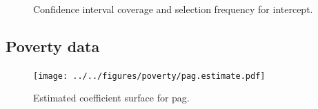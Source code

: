\documentclass[authoryear ,review]{elsarticle}
\begin{document}
			
			\begin{figure}
				\begin{center}
					\caption{Confidence interval coverage and selection frequency for intercept.\label{figIntercept}}
				\end{center}
			\end{figure}
			
			
			
			
			
		\subsection{Poverty data}
			\begin{figure}
				\begin{center}
					\texttt{[image: ../../figures/poverty/pag.estimate.pdf]}
					\caption{Estimated coefficient surface for pag.\label{fig:pag}}
				\end{center}
			\end{figure}
					
\end{document}
